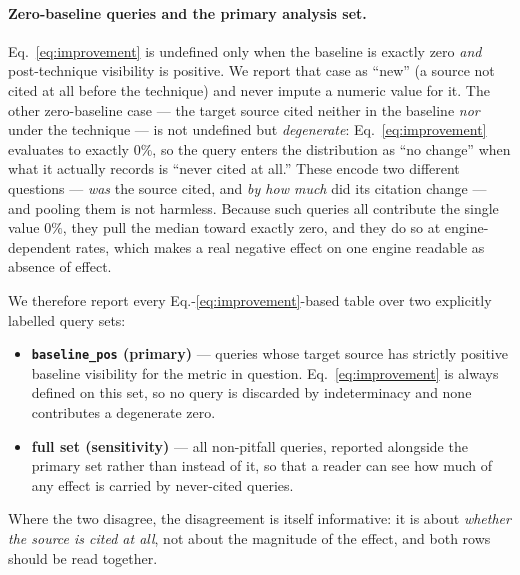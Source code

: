 \documentclass[11pt,a4paper]{article}
\begin{document}
\paragraph{Zero-baseline queries and the primary analysis set.}
Eq.~\ref{eq:improvement} is undefined only when the baseline is exactly
zero \emph{and} post-technique visibility is positive. We report that case
as ``new'' (a source not cited at all before the technique) and never
impute a numeric value for it. The other zero-baseline case --- the target
source cited neither in the baseline \emph{nor} under the technique --- is
not undefined but \emph{degenerate}: Eq.~\ref{eq:improvement} evaluates to
exactly $0\%$, so the query enters the distribution as ``no change'' when
what it actually records is ``never cited at all.'' These encode two
different questions --- \emph{was} the source cited, and \emph{by how much}
did its citation change --- and pooling them is not harmless. Because such
queries all contribute the single value $0\%$, they pull the median toward
exactly zero, and they do so at engine-dependent rates, which makes a real
negative effect on one engine readable as absence of effect.

We therefore report every Eq.-\ref{eq:improvement}-based table over two
explicitly labelled query sets:
\begin{itemize}[nosep]
  \item \textbf{\texttt{baseline\_pos} (primary)} --- queries whose target
    source has strictly positive baseline visibility for the metric in
    question. Eq.~\ref{eq:improvement} is always defined on this set, so no
    query is discarded by indeterminacy and none contributes a degenerate
    zero.
  \item \textbf{full set (sensitivity)} --- all non-pitfall queries,
    reported alongside the primary set rather than instead of it, so that a
    reader can see how much of any effect is carried by
    never-cited queries.
\end{itemize}
Where the two disagree, the disagreement is itself informative: it is about
\emph{whether the source is cited at all}, not about the magnitude of the
effect, and both rows should be read together.
\end{document}

